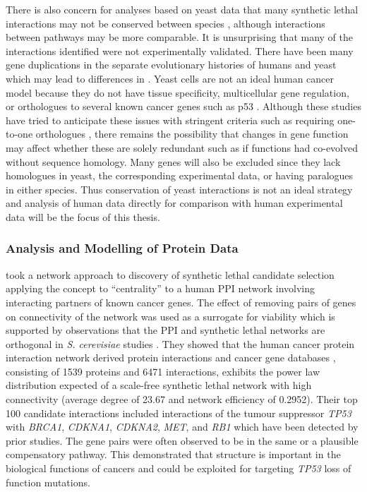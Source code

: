 There is also concern for analyses based on yeast data that many \gls{synthetic lethal} interactions may not be conserved between species \citep{Dixon2009a}, although interactions between \glspl{pathway} may be more comparable. It is unsurprising that many of the interactions identified were not experimentally validated. There have been many gene duplications in the separate evolutionary histories of humans and yeast which may lead to differences in . Yeast cells are not an ideal human cancer model because they do not have tissue specificity, multicellular gene regulation, or orthologues to several known \glspl{cancer gene} such as p53 \citep{Guaragnella2014}. Although these studies have tried to anticipate these issues with stringent criteria such as requiring one-to-one orthologues \citep{Deshpande2013, Heiskanen2012, Kranthi2013}, there remains the possibility that changes in gene function may affect whether these are solely redundant such as if functions had co-evolved without sequence homology. Many genes will also be excluded since they lack homologues in yeast, the corresponding experimental data, or having paralogues in either species. Thus conservation of yeast interactions is not an ideal strategy and analysis of human data directly for comparison with human experimental data will be the focus of this thesis. 

\subsubsection{Analysis and Modelling of Protein Data}

\citet{Kranthi2013} took a network approach to discovery of \gls{synthetic lethal} candidate selection applying the concept to ``centrality'' to a human \gls{PPI} network involving interacting partners of known \glspl{cancer gene}. The effect of removing pairs of genes on connectivity of the network was used as a surrogate for viability which is supported by observations that the \gls{PPI} and \gls{synthetic lethal} networks are orthogonal in \textit{S. cerevisiae} studies \citep{Tong2004}. They showed that the human cancer protein interaction network derived protein interactions and cancer gene databases \citep{Futreal2004, Higgins2007,KeshavaPrasad2009}, consisting of 1539 proteins and 6471 interactions, exhibits the power law distribution expected of a \gls{scale-free} \gls{synthetic lethal} network with high connectivity (average  degree of 23.67 and network efficiency of 0.2952). Their top 100 candidate interactions included interactions of the \gls{tumour suppressor} \textit{TP53} with \textit{BRCA1}, \textit{CDKNA1}, \textit{CDKNA2}, \textit{MET}, and \textit{RB1} which have been detected by prior studies. The gene pairs were often observed to be in the same or a plausible compensatory pathway. This demonstrated that  structure is important in the biological functions of cancers and could be exploited for targeting \textit{TP53} loss of function \glspl{mutation}. 

